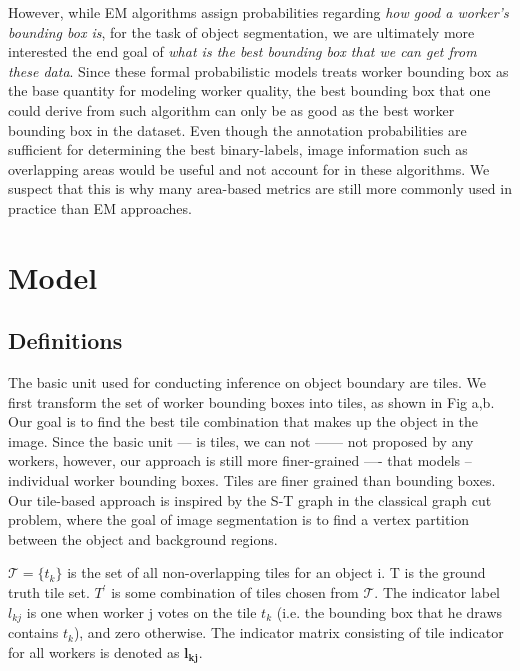 \documentclass[letterpaper]{article} %
\begin{document}
\par However, while EM algorithms assign probabilities regarding  \textit{how good a worker's bounding box is}, for the task of object segmentation, we are ultimately more interested the end goal of \textit{what is the best bounding box that we can get from these data}. Since these formal probabilistic models treats worker bounding box as the base quantity for modeling worker quality, the best bounding box that one could derive from such algorithm can only be as good as the best worker bounding box in the dataset.  Even though the annotation probabilities are sufficient for determining the best binary-labels, image information such as overlapping areas would be useful and not account for in these algorithms. We suspect that this is why many area-based metrics are still more commonly used in practice than EM approaches.
\section{Model}
\subsection{Definitions}

\par The basic unit used for conducting inference on object boundary are tiles. We first transform the set of worker bounding boxes into tiles, as shown in Fig a,b. Our goal is to find the best tile combination that makes up the object in the image. Since the basic unit ---  is tiles, we can not ------ not proposed by any workers, however, our approach is still more finer-grained ---- that models -- individual worker bounding boxes. 
Tiles are finer grained than bounding boxes. Our tile-based approach is inspired by the S-T graph in the classical graph cut problem, where the goal of image segmentation is to find a vertex partition between the object and background regions.

\par $\mathcal{T}=\{t_k\}$ is the set of all non-overlapping tiles for an object i. T is the ground truth tile set. $T^\prime$ is some combination of tiles chosen from $\mathcal{T}$.
 The indicator label $l_{kj}$ is one when worker j votes on the tile $t_{k}$ (i.e. the bounding box that he draws contains $t_{k}$), and zero otherwise. The indicator matrix consisting of tile indicator for all workers is denoted as $\mathbf{l_{kj}}$.
\end{document}
